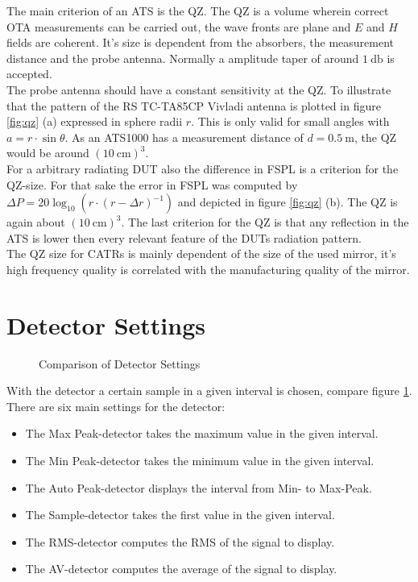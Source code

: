 The main criterion of an \ac{ATS} is the \ac{QZ}. The \ac{QZ} is a volume wherein correct \ac{OTA} measurements can be carried out, the wave fronts are plane and $E$ and $H$ fields are coherent. It's size is dependent from the absorbers, the measurement distance and the probe antenna. Normally a amplitude taper of around $\SI{1}{\decibel}$ is accepted.\\
The probe antenna should have a constant sensitivity at the \ac{QZ}. To illustrate that the pattern of the \ac{RS} TC-TA85CP Vivladi antenna is plotted in figure \ref{fig:qz} (a) expressed in sphere radii $r$. This is only valid for small angles with $a=r\cdot\sin \theta$. As an ATS1000 has a measurement distance of $d = \SI{0.5}{\meter}$, the \ac{QZ} would be around $\left(\SI{10}{\centi\meter}\right)^3$.\\
For a arbitrary radiating \ac{DUT} also the difference in \ac{FSPL} is a criterion for the \ac{QZ}-size. For that sake the error in \ac{FSPL} was computed by $\Delta P = 20\log_{10}\left(r\cdot\left(r-\Delta r\right)^{-1}\right)$ and depicted in figure \ref{fig:qz} (b). The \ac{QZ} is again about $\left(\SI{10}{\centi\meter}\right)^3$. The last criterion for the \ac{QZ} is that any reflection in the \ac{ATS} is lower then every relevant feature of the \ac{DUT}s radiation pattern.\cite{ach}\\
The \ac{QZ} size for \acp{CATR} is mainly dependent of the size of the used mirror, it's high frequency quality is correlated with the manufacturing quality of the mirror.

\section{Detector Settings}

\begin{figure}[h]
\centering
\def\svgwidth{0.7\textwidth}

\caption{Comparison of Detector Settings \cite{funsspec}}
\label{fig:detset}
\end{figure}
With the detector a certain sample in a given interval is chosen, compare figure \ref{fig:detset}. There are six main settings for the detector: \cite{funsspec}
\begin{itemize}
\item The \textcolor[RGB]{237,28,36}{Max Peak-detector} takes the maximum value in the given interval.
\item The \textcolor[RGB]{0,166,88}{Min Peak-detector} takes the minimum value in the given interval.
\item The \textcolor[RGB]{0,94,138}{Auto Peak-detector} displays the interval from Min- to Max-Peak.
\item The \textcolor[RGB]{0,173,239}{Sample-detector} takes the first value in the given interval.
\item The \textcolor[RGB]{246,135,18}{RMS-detector} computes the \ac{RMS} of the signal to display.
\item The \textcolor[RGB]{114,100,184}{AV-detector} computes the average of the signal to display.
\end{itemize}

